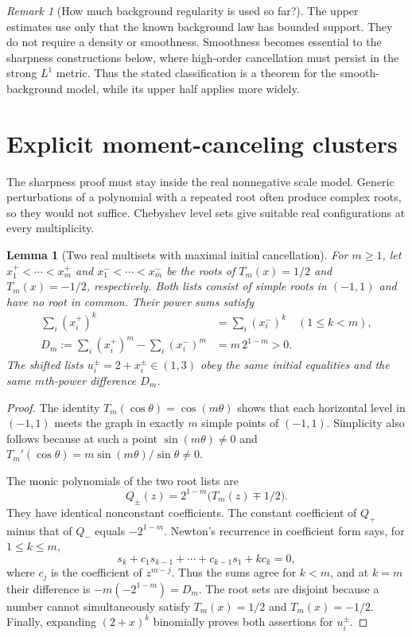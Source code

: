 \documentclass[11pt,a4paper]{article}
\numberwithin{equation}{section}
\newtheorem{lemma}[lemma]{Lemma}
\theoremstyle{definition}
\theoremstyle{remark}
\newtheorem{remark}[remark]{Remark}
\begin{document}
\begin{remark}[How much background regularity is used so far?]
The upper estimates use only that the known background law has bounded support.
They do not require a density or smoothness.  Smoothness becomes essential to
the sharpness constructions below, where high-order cancellation must persist
in the strong $L^1$ metric.  Thus the stated classification is a theorem for the
smooth-background model, while its upper half applies more widely.
\end{remark}

\section{Explicit moment-canceling clusters}
\label{sec:chebyshev}

The sharpness proof must stay inside the real nonnegative scale model.  Generic
perturbations of a polynomial with a repeated root often produce complex roots,
so they would not suffice.  Chebyshev level sets give suitable real configurations
at every multiplicity.

\begin{lemma}[Two real multisets with maximal initial cancellation]
\label{lem:cheb}
For $m\ge1$, let $x_1^+<\cdots<x_m^+$ and $x_1^-<\cdots<x_m^-$ be the roots of
$T_m(x)=1/2$ and $T_m(x)=-1/2$, respectively.  Both lists consist of simple roots
in $(-1,1)$ and have no root in common.  Their power sums satisfy
\begin{align}
 \sum_i(x_i^+)^k&=\sum_i(x_i^-)^k\quad(1\le k<m),
 \label{eq:cheb-cancel}\\
 D_m:=\sum_i(x_i^+)^m-\sum_i(x_i^-)^m&=m\,2^{1-m}>0.
 \label{eq:Dm}
\end{align}
The shifted lists $u_i^\pm=2+x_i^\pm\in(1,3)$ obey the same initial equalities
and the same $m$th-power difference $D_m$.
\end{lemma}
\begin{proof}
The identity $T_m(\cos\theta)=\cos(m\theta)$ shows that each horizontal level
in $(-1,1)$ meets the graph in exactly $m$ simple points of $(-1,1)$.  Simplicity
also follows because at such a point $\sin(m\theta)\ne0$ and
$T_m'(\cos\theta)=m\sin(m\theta)/\sin\theta\ne0$.

The monic polynomials of the two root lists are
\begin{equation}
 Q_\pm(z)=2^{1-m}\bigl(T_m(z)\mp1/2\bigr).
 \label{eq:cheb-poly}
\end{equation}
They have identical nonconstant coefficients.  The constant coefficient of
$Q_+$ minus that of $Q_-$ equals $-2^{1-m}$.  Newton's recurrence in coefficient form
says, for $1\le k\le m$,
\[
 s_k+c_1s_{k-1}+\cdots+c_{k-1}s_1+kc_k=0,
\]
where $c_j$ is the coefficient of $z^{m-j}$.  Thus the sums agree for $k<m$, and
at $k=m$ their difference is $-m(-2^{1-m})=D_m$.  The root sets are disjoint
because a number cannot simultaneously satisfy $T_m(x)=1/2$ and $T_m(x)=-1/2$.
Finally, expanding $(2+x)^k$ binomially proves both assertions for $u_i^\pm$.
\end{proof}
\end{document}
